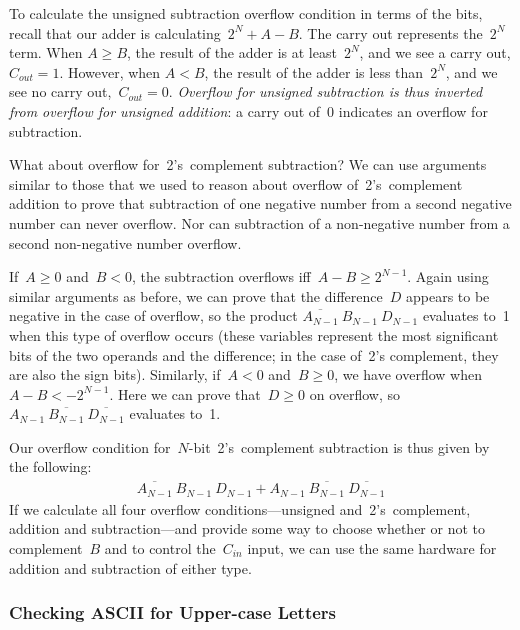 \pagebreak

To calculate the unsigned subtraction overflow condition in terms of the
bits, recall that our adder is calculating~$2^N+A-B$.  The carry out
represents the~$2^N$ term.  When $A\geq{B}$, the result of the adder
is at least~$2^N$, and we see a carry out, $C_{out}=1$.  However, when
$A<B$, the result of the adder is less than~$2^N$, and we see no carry
out,~$C_{out}=0$.  {\em Overflow for unsigned subtraction is thus inverted 
from overflow for unsigned addition}: a carry out of~0 indicates an 
overflow for subtraction.

What about overflow for~2's~complement subtraction?  We can use arguments
similar to those that we used to reason about overflow of~2's~complement
addition to prove that subtraction of one negative number from a second
negative number can never overflow.  Nor can subtraction of a non-negative
number from a second non-negative number overflow.

If~$A\geq{0}$ and~$B<0$, the subtraction overflows iff~$A-B\geq{2^{N-1}}$.
Again using similar arguments as before, we can prove that the difference~$D$
appears to be negative in the case of overflow, so the product
$\overline{A_{N-1}}~B_{N-1}~D_{N-1}$ evaluates to~1 when this type of
overflow occurs (these variables represent the most significant bits of the 
two operands and the difference; in the case of~2's complement, they are
also the sign bits).
%
Similarly, if~$A<0$ and~$B\geq{0}$, we have overflow when~$A-B<-2^{N-1}$.
Here we can prove that~$D\geq{0}$ on overflow, so 
$A_{N-1}~\overline{B_{N-1}}~\overline{D_{N-1}}$ evaluates to~1.

Our overflow condition for~\mbox{$N$-bit}~2's~complement subtraction
is thus given by the following:
%
\begin{eqnarray*}
\overline{A_{N-1}}~B_{N-1}~D_{N-1}+A_{N-1}~\overline{B_{N-1}}~\overline{D_{N-1}}
\end{eqnarray*}
%
If we calculate all four overflow conditions---unsigned and~2's~complement,
addition and subtraction---and provide some way to choose whether or not to 
complement~$B$ and to control the~$C_{in}$ input, we can use the same hardware
for addition and subtraction of either type.\\

\subsubsection{Checking ASCII for Upper-case Letters}

